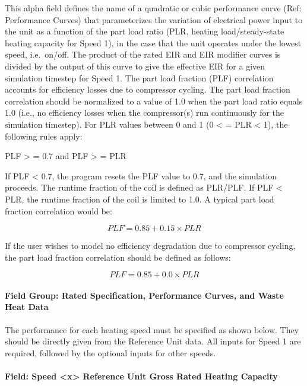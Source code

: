 This alpha field defines the name of a quadratic or cubic performance curve (Ref: Performance Curves) that parameterizes the variation of electrical power input to the unit as a function of the part load ratio (PLR, heating load/steady-state heating capacity for Speed 1), in the case that the unit operates under the lowest speed, i.e.~on/off. The product of the rated EIR and EIR modifier curves is divided by the output of this curve to give the effective EIR for a given simulation timestep for Speed 1. The part load fraction (PLF) correlation accounts for efficiency losses due to compressor cycling. The part load fraction correlation should be normalized to a value of 1.0 when the part load ratio equals 1.0 (i.e., no efficiency losses when the compressor(s) run continuously for the simulation timestep). For PLR values between 0 and 1 (0 \textless{} = PLR \textless{} 1), the following rules apply:

PLF \textgreater{} = 0.7 and PLF \textgreater{} = PLR

If PLF \textless{} 0.7, the program resets the PLF value to 0.7, and the simulation proceeds. The runtime fraction of the coil is defined as PLR/PLF. If PLF \textless{} PLR, the runtime fraction of the coil is limited to 1.0. A typical part load fraction correlation would be:

\begin{equation}
PLF = 0.85 + 0.15 \times PLR
\end{equation}

If the user wishes to model no efficiency degradation due to compressor cycling, the part load fraction correlation should be defined as follows:

\begin{equation}
PLF = 0.85 + 0.0 \times PLR
\end{equation}

\paragraph{Field Group: Rated Specification, Performance Curves, and Waste Heat Data}\label{field-group-rated-specification-performance-curves-and-waste-heat-data-2}

The performance for each heating speed must be specified as shown below. They should be directly given from the Reference Unit data. All inputs for Speed 1 are required, followed by the optional inputs for other speeds.

\paragraph{Field: Speed \textless{}x\textgreater{} Reference Unit Gross Rated Heating Capacity}\label{field-speed-x-reference-unit-gross-rated-heating-capacity-1}

